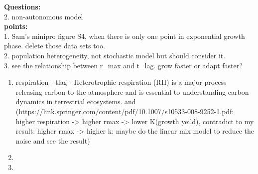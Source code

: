 
\textbf{Questions:} \\
2. non-autonomous model\\



\textbf{points:}\\
1. Sam's minipro figure S4, when there is only one point in exponential growth phase. delete those data sets too.\\
2. population heterogeneity, not stochastic model but should consider it.\\
3. see the relationship between r\_max and t\_lag. grow faster or adapt faster?\\
\begin{enumerate}
    \item respiration - tlag - Heterotrophic respiration (RH) is a major process releasing carbon to the atmosphere and is essential to understanding carbon dynamics in terrestrial ecosystems. and (https://link.springer.com/content/pdf/10.1007/s10533-008-9252-1.pdf: higher respiration -> higher rmax -> lower K(growth yeild), contradict to my result: higher rmax -> higher k: maybe do the linear mix model to reduce the noise and see the result)\\
    
    \item %
    
    \item 
\end{enumerate}



